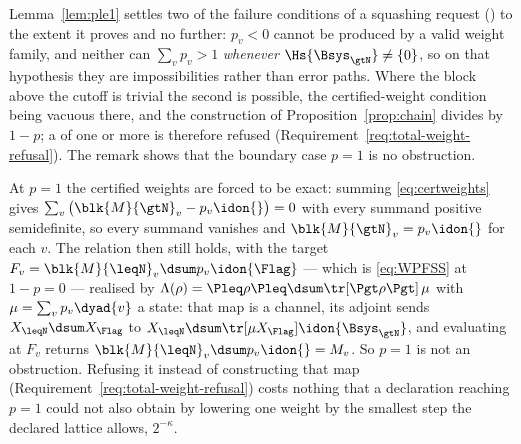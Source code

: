 
Lemma~\ref{lem:ple1} settles two of the failure conditions of a squashing
request () to the extent it
proves and no further: $p_v<0$ cannot be produced by a valid weight family,
and neither can $\sum_vp_v>1$ \emph{whenever $\Hs{\Bsys_{\gtN}}\ne\{0\}$}, so
on that hypothesis they are impossibilities rather than error paths. Where the
block above the cutoff is trivial the second is possible, the certified-weight
condition being vacuous there, and the construction of
Proposition~\ref{prop:chain} divides by $1-p$; a  of one
or more is therefore refused (Requirement~\ref{req:total-weight-refusal}). The
remark shows that the boundary case $p=1$ is no obstruction.

\begin{remark}
\label{rem:peqone}
At $p=1$ the certified weights are forced to be exact: summing
\eqref{eq:certweights} gives
$\sum_v\big(\blk{M}{\gtN}_v-p_v\idon{}\big)=0$ with every summand positive
semidefinite, so every summand vanishes and
$\blk{M}{\gtN}_v=p_v\idon{}$ for each $v$. The relation then still holds, with
the target $F_v=\blk{M}{\leqN}_v\dsum p_v\idon{\Flag}$ --- which is
\eqref{eq:WPFSS} at $1-p=0$ --- realised by
$\Lambda(\rho)=\Pleq\rho\Pleq\dsum\tr[\Pgt\rho\Pgt]\,\mu$ with
$\mu=\sum_vp_v\dyad{v}$ a state: that map is a channel, its adjoint sends
$X_{\leqN}\dsum X_{\Flag}$ to
$X_{\leqN}\dsum\tr[\mu X_{\Flag}]\idon{\Bsys_{\gtN}}$, and evaluating at $F_v$
returns $\blk{M}{\leqN}_v\dsum p_v\idon{}=M_v$. So $p=1$ is not an
obstruction. Refusing it instead of constructing that map
(Requirement~\ref{req:total-weight-refusal}) costs nothing that a declaration
reaching $p=1$ could not also obtain by lowering one weight by the smallest
step the declared lattice allows, $2^{-\kappa}$.
\end{remark}

